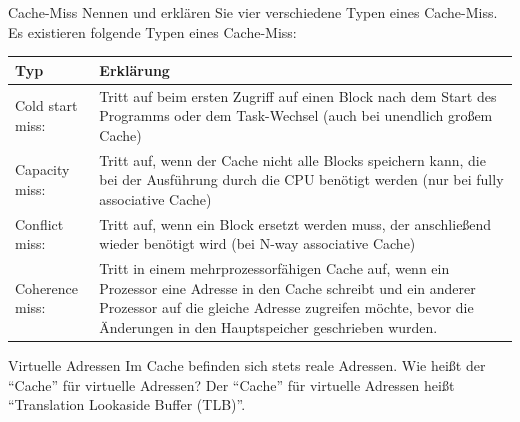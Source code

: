 \begin{aufgabe}[Cache]{Cache-Miss}
    Nennen und erklären Sie vier verschiedene Typen eines Cache-Miss.
    \tcblower
    Es existieren folgende Typen eines Cache-Miss:\\
    \begin{tabularx}{\textwidth}{|l|X|}
        \toprule
        Typ              & Erklärung                                                                                                                                          \\
        \midrule
        Cold start miss: & Tritt auf beim ersten Zugriff auf einen Block nach dem Start des Programms oder dem Task-Wechsel (auch bei unendlich großem Cache)                 \\
        \midrule
        Capacity miss:   & Tritt auf, wenn der Cache nicht alle Blocks speichern kann, die bei der Ausführung durch die CPU benötigt werden (nur bei fully associative Cache) \\
        \midrule
        Conflict miss:   & Tritt auf, wenn ein Block ersetzt werden muss, der anschließend wieder benötigt wird (bei N-way associative Cache)                                 \\
        \midrule
        Coherence miss:  & Tritt in einem mehrprozessorfähigen Cache auf,
        wenn ein Prozessor eine Adresse in den Cache schreibt und ein anderer Prozessor auf die gleiche Adresse zugreifen möchte,
        bevor die Änderungen in den Hauptspeicher geschrieben wurden.                                                                                                         \\
        \bottomrule
    \end{tabularx}
\end{aufgabe}

\begin{aufgabe}[Cache]{Virtuelle Adressen}
    Im Cache befinden sich stets reale Adressen.
    Wie heißt der \enquote{Cache} für virtuelle Adressen?
    \tcblower
    Der \enquote{Cache} für virtuelle Adressen heißt \enquote{Translation Lookaside Buffer (TLB)}.
\end{aufgabe}

